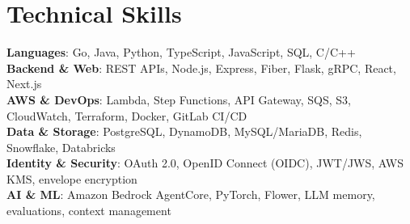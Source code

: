 \documentclass[letterpaper,11pt]{article}
\begin{document}
\section{Technical Skills}
 \begin{itemize}[leftmargin=0pt, label={}, topsep=0pt, partopsep=0pt, parsep=0pt, itemsep=0pt]
    \small{\item{

      \textbf{Languages}{: Go, Java, Python, TypeScript, JavaScript, SQL, C/C++} \\
      \textbf{Backend \& Web}{: REST APIs, Node.js, Express, Fiber, Flask, gRPC, React, Next.js} \\
      \textbf{AWS \& DevOps}{: Lambda, Step Functions, API Gateway, SQS, S3, CloudWatch, Terraform, Docker, GitLab CI/CD} \\
      \textbf{Data \& Storage}{: PostgreSQL, DynamoDB, MySQL/MariaDB, Redis, Snowflake, Databricks} \\
      \textbf{Identity \& Security}{: OAuth 2.0, OpenID Connect (OIDC), JWT/JWS, AWS KMS, envelope encryption} \\
      \textbf{AI \& ML}{: Amazon Bedrock AgentCore, PyTorch, Flower, LLM memory, evaluations, context management} \\
    }}
 \end{itemize}
\end{document}

